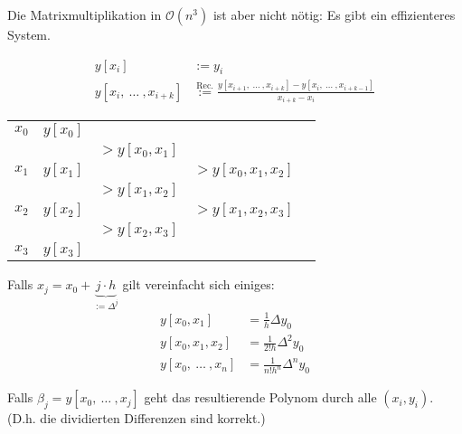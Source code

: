 Die Matrixmultiplikation in $\mathcal{O}(n^3)$ ist aber nicht nötig: Es gibt ein effizienteres System. 

\setcounter{all}{5}
\begin{multicols}{2}
    \begin{align*}
        y[x_i] &:= y_i \\
        y[x_i,\ \ldots\ ,x_{i+k}] &\overset{\text{Rec.}}{:=} \frac{y[x_{i+1},\ \ldots\ , x_{i+k}] - y[x_i,\ \ldots\ , x_{i+k-1}]}{x_{i+k}-x_i}
    \end{align*}

    \newcolumn

    \begin{center}
    \begin{tabular}{l|llll}
        $x_0$ & $y[x_0]$ \\
            &          & $>y[x_0,x_1]$        \\
        $x_1$ & $y[x_1]$ &  & $>y[x_0,x_1,x_2]$ \\ 
            &          & $>y[x_1,x_2]$        \\
        $x_2$ & $y[x_2]$ &  & $>y[x_1,x_2,x_3]$ \\
            &          & $>y[x_2,x_3]$        \\
        $x_3$ & $y[x_3]$                        \\
    \end{tabular}
    \end{center}
\end{multicols}


Falls $x_j = x_0 + \underbrace{j \cdot h}_{:= \Delta^j}$ gilt vereinfacht sich einiges:
\begin{align*}
    y[x_0,x_1] &= \frac{1}{h}\Delta y_0 \\
    y[x_0,x_1,x_2] &= \frac{1}{2!h} \Delta^2 y_0 \\
    y[x_0,\ \ldots\ , x_n] &= \frac{1}{n! h^n} \Delta^n y_0 
\end{align*}

\setcounter{all}{8}
 Falls $\beta_j = y[x_0,\ \ldots\ , x_j]$ geht das resultierende Polynom durch alle $(x_i,y_i)$.\\
\footnotesize
(D.h. die dividierten Differenzen sind korrekt.)
\normalsize


